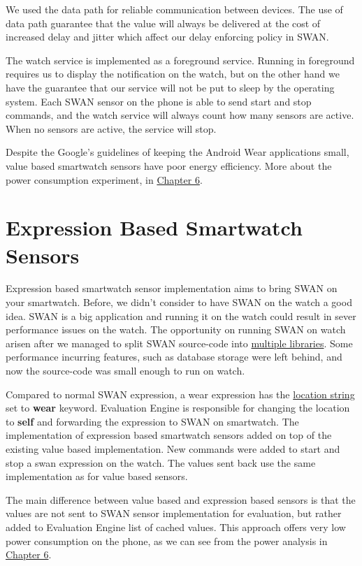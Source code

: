 We used the data path \cite{android_wear_datapath} for reliable communication between devices. The use of data path guarantee that the value will always be delivered at the cost of increased delay
and jitter\cite{jitter_ref} which affect our delay enforcing policy in SWAN.

The watch service is implemented as a foreground service\cite{foreground_service}. Running in foreground requires us to display the notification on the watch, but on the other hand we have the 
guarantee that our service will not be put to sleep by the operating system. 
Each SWAN sensor on the phone  is able to send start and stop commands, and the watch service will always count how many sensors are active. When no sensors are active, the service will stop.

Despite the Google's guidelines of keeping the Android Wear applications small, value based smartwatch sensors have poor energy efficiency. More about the power consumption experiment, 
in \hyperref[Chapter6]{Chapter 6}.

\section{Expression  Based  Smartwatch Sensors }

Expression based smartwatch sensor implementation aims to bring SWAN on your smartwatch. Before, we didn't consider to have SWAN on the watch a good idea. SWAN is a big application and running
it on the watch could result in sever performance issues on the watch. The opportunity on running SWAN on watch arisen after we managed to split SWAN source-code into \hyperref[scc:swan_split]{multiple libraries}. Some performance incurring features, such as database storage were left behind, and now the source-code was small enough to run on watch.

Compared to normal SWAN expression, a wear expression has the \hyperref[fig:SwanExpression]{location string} set to \textbf{wear} keyword. Evaluation Engine is responsible for changing the location
to \textbf{self} and forwarding the expression to SWAN on smartwatch.
The implementation of expression based smartwatch sensors added on top of the existing value based implementation. New commands were added to start and stop a swan expression on the watch.
The values sent back use the same implementation as for value based sensors. 

The main difference between value based and expression based sensors is that the values are not sent to SWAN sensor implementation for evaluation, but rather added to Evaluation Engine list of cached
values. This approach offers very low power consumption on the phone, as we can see from the power analysis in \hyperref[Chapter6]{Chapter 6}.
